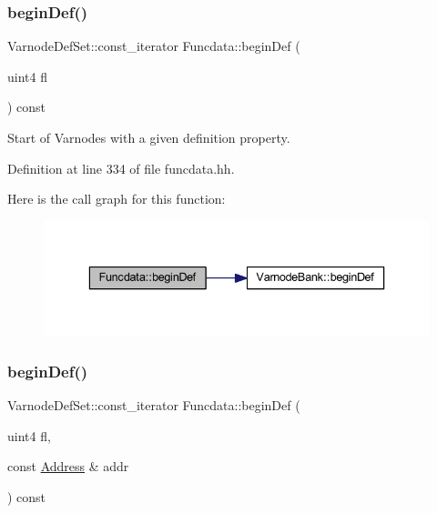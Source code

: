 \subsubsection{\texorpdfstring{beginDef()}{beginDef()}\hspace{0.1cm}{\footnotesize\ttfamily [2/3]}}
{\footnotesize\ttfamily Varnode\+Def\+Set\+::const\+\_\+iterator Funcdata\+::begin\+Def (\begin{DoxyParamCaption}\item[{uint4}]{fl }\end{DoxyParamCaption}) const\hspace{0.3cm}{\ttfamily [inline]}}



Start of Varnodes with a given definition property. 



Definition at line 334 of file funcdata.\+hh.

Here is the call graph for this function\+:
\nopagebreak
\begin{figure}[H]
\begin{center}
\leavevmode
\includegraphics[width=336pt]{class_funcdata_a721c960a75b9ac5652a620b6195e33f5_cgraph}
\end{center}
\end{figure}
\mbox{\label{class_funcdata_a52feb85441fe82ca75ec8334244d0426}} 
\subsubsection{\texorpdfstring{beginDef()}{beginDef()}\hspace{0.1cm}{\footnotesize\ttfamily [3/3]}}
{\footnotesize\ttfamily Varnode\+Def\+Set\+::const\+\_\+iterator Funcdata\+::begin\+Def (\begin{DoxyParamCaption}\item[{uint4}]{fl,  }\item[{const \mbox{\hyperlink{class_address}{Address}} \&}]{addr }\end{DoxyParamCaption}) const\hspace{0.3cm}{\ttfamily [inline]}}



